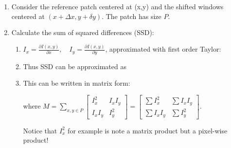 \documentclass[10pt,a4paper]{scrartcl}
\begin{document}
\begin{multicols*}{2}
\begin{enumerate}
\item Consider the reference patch centered at (x,y) and the shifted windows centered at $(x+\Delta x,y+\delta y)$. The patch has size $P$.
\item Calculate the sum of squared differences (SSD):
\begin{enumerate}
\item $I_x=\frac{\partial I(x,y)}{\partial x},\quad I_y=\frac{\partial I(x,y)}{\partial y}$, approximated with first order Taylor:

\item Thus SSD can be approximated as


\item This can be written in matrix form:


where $M=\sum\limits_{x,y\in P}\begin{bmatrix}
I_x^2&I_xI_y\\I_xI_y&I_y^2
\end{bmatrix}=\begin{bmatrix}
\sum I_x^2&\sum I_xI_y\\\sum I_xI_y&\sum I_y^2
\end{bmatrix}$.

Notice that $I_x^2$ for example is note a matrix product but a pixel-wise product!

\end{enumerate}


\end{enumerate}
\end{multicols*}
\end{document}
